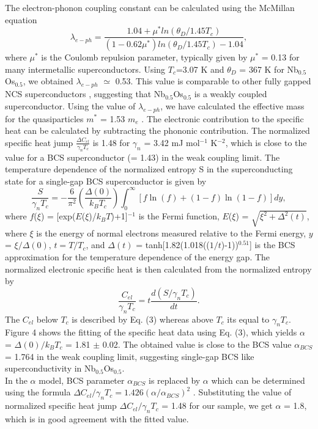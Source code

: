 \documentclass[reprint, superscriptaddress, secnumarabic, amssymb, nobibnotes, aps, prl]{revtex4-1}
\begin{document}
The electron-phonon coupling constant can be calculated using the McMillan equation \cite{WL}
\begin{equation}
\lambda_{e-ph} = \frac{1.04+\mu^{*}ln(\theta_{D}/1.45T_{c})}{(1-0.62\mu^{*})ln(\theta_{D}/1.45T_{c})-1.04 } ,
\label{eqn1:ld}
\end{equation}                       
where $\mu^{*}$ is the Coulomb repulsion parameter, typically given by $\mu^{*}$ = 0.13 for many intermetallic superconductors. Using $T_{c}$=3.07 K and $\theta_{D}$ = 367 K for Nb$_{0.5}$Os$_{0.5}$, we obtained $\lambda_{e-ph}$ $\simeq$ 0.53. This value is comparable to other fully gapped NCS superconductors \cite{nr1,RT1,sas}, suggesting that Nb$_{0.5}$Os$_{0.5}$ is a weakly coupled superconductor. Using the value of $\lambda_{e-ph}$, we have calculated the effective mass for the quasiparticles $m^{*}$ = 1.53 $m_{e}$ \cite{GG}. The electronic contribution to the specific heat can be calculated by subtracting the phononic contribution. The normalized specific heat jump $\frac{\Delta C_{el}}{\gamma_{n}T_{c}}$ is 1.48 for $\gamma_{n}$ = 3.42 mJ mol$^{-1}$ K$^{-2}$, which is close to the value for a BCS superconductor (= 1.43) in the weak coupling limit.
The temperature dependence of the normalized entropy S in the superconducting state for a single-gap BCS superconductor is given by  
\begin{equation}
\frac{S}{\gamma_{n}T_{c}} = -\frac{6}{\pi^2}\left(\frac{\Delta(0)}{k_{B}T_{c}}\right)\int_{0}^{\infty}[ \textit{f}\ln(f)+(1-f)\ln(1-f)]dy ,
\label{eqn2:s}
\end{equation}
where $\textit{f}$($\xi$) = [exp($\textit{E}$($\xi$)/$k_{B}T$)+1]$^{-1}$ is the Fermi function, $\textit{E}$($\xi$) = $\sqrt{\xi^{2}+\Delta^{2}(t)}$, where $\xi$ is the energy of normal electrons measured relative to the Fermi energy, $\textit{y}$ = $\xi/\Delta(0)$, $\mathit{t = T/T_{c}}$, and $\Delta(t)$ = tanh[1.82(1.018(($\mathit{1/t}$)-1))$^{0.51}$] is the BCS approximation for the temperature dependence of the energy gap. The normalized electronic specific heat is then calculated from the normalized entropy by
\begin{equation}
\frac{C_{el}}{\gamma_{n}T_{c}} = t\frac{d(S/\gamma_{n}T_{c})}{dt} .
\label{eqn3:Cel}
\end{equation}
The $C_{el}$ below $T_{c}$ is described by Eq. (3) whereas above $T_{c}$ its equal to $\gamma_{n}T_{c}$. Figure 4 shows the fitting of the specific heat data using Eq. (3), which yields $\alpha$ = $\Delta(0)/k_{B}T_{c}$ = 1.81 $\pm$ 0.02. The obtained value is close to the BCS value $\alpha_{BCS}$ = 1.764 in the weak coupling limit, suggesting single-gap BCS like superconductivity in Nb$_{0.5}$Os$_{0.5}$.\\  
In the $\alpha$ model, BCS parameter $\alpha_{BCS}$ is replaced by $\alpha$ which can be determined using the formula $\Delta C_{el}/\gamma_{n}T_{c} = 1.426(\alpha/\alpha_{BCS})^{2}$ \cite{DC}. Substituting the value of normalized specific heat jump $\Delta C_{el}/\gamma_{n}T_{c}$ = 1.48 for our sample, we get $\alpha$ = 1.8, which is in good agreement with the fitted value.
\\
\end{document}
